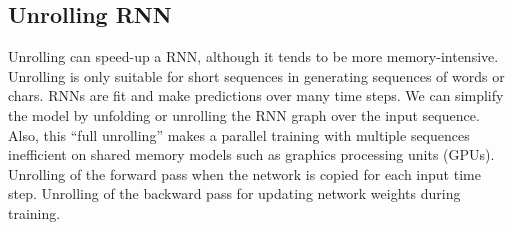 \subsection{Unrolling RNN}
Unrolling can speed-up a RNN, although it tends to be more memory-intensive. Unrolling is only suitable for short sequences in generating sequences of words or chars.
RNNs are fit and make predictions over many time steps. We can simplify the model by unfolding or unrolling the RNN graph over the input sequence. Also, this “full unrolling” makes a parallel training with multiple sequences inefficient on shared memory models such as graphics processing units (GPUs).\cite{web014} Unrolling of the forward pass when the network is copied for each input time step. Unrolling of the backward pass for updating network weights during training.